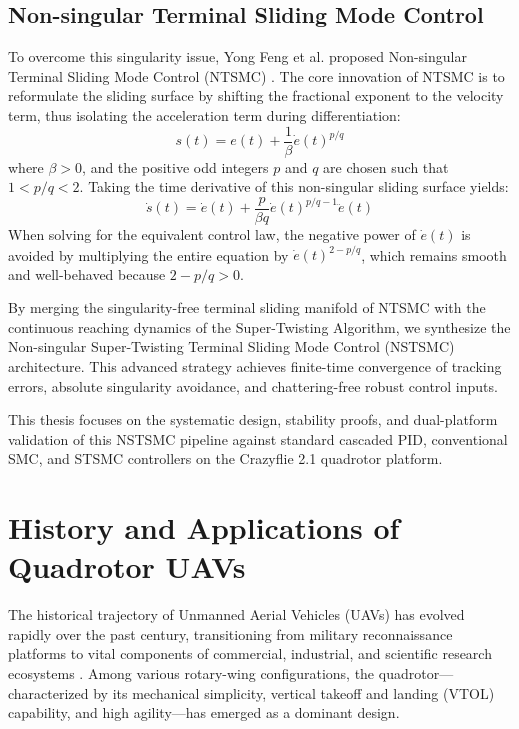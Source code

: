 \subsection{Non-singular Terminal Sliding Mode Control}
To overcome this singularity issue, Yong Feng et al. proposed Non-singular Terminal Sliding Mode Control (NTSMC) \cite{ref_26}. The core innovation of NTSMC is to reformulate the sliding surface by shifting the fractional exponent to the velocity term, thus isolating the acceleration term during differentiation:
\begin{equation}
s(t) = e(t) + \frac{1}{\beta} \dot{e}(t)^{p/q}
\end{equation}
where $\beta > 0$, and the positive odd integers $p$ and $q$ are chosen such that $1 < p/q < 2$. Taking the time derivative of this non-singular sliding surface yields:
\begin{equation}
\dot{s}(t) = \dot{e}(t) + \frac{p}{\beta q} \dot{e}(t)^{p/q - 1} \ddot{e}(t)
\end{equation}
When solving for the equivalent control law, the negative power of $\dot{e}(t)$ is avoided by multiplying the entire equation by $\dot{e}(t)^{2 - p/q}$, which remains smooth and well-behaved because $2 - p/q > 0$. 

By merging the singularity-free terminal sliding manifold of NTSMC with the continuous reaching dynamics of the Super-Twisting Algorithm, we synthesize the Non-singular Super-Twisting Terminal Sliding Mode Control (NSTSMC) architecture. This advanced strategy achieves finite-time convergence of tracking errors, absolute singularity avoidance, and chattering-free robust control inputs. 

This thesis focuses on the systematic design, stability proofs, and dual-platform validation of this NSTSMC pipeline against standard cascaded PID, conventional SMC, and STSMC controllers on the Crazyflie 2.1 quadrotor platform.

\section{History and Applications of Quadrotor UAVs}
The historical trajectory of Unmanned Aerial Vehicles (UAVs) has evolved rapidly over the past century, transitioning from military reconnaissance platforms to vital components of commercial, industrial, and scientific research ecosystems \cite{ref_12}. Among various rotary-wing configurations, the quadrotor—characterized by its mechanical simplicity, vertical takeoff and landing (VTOL) capability, and high agility—has emerged as a dominant design. 

